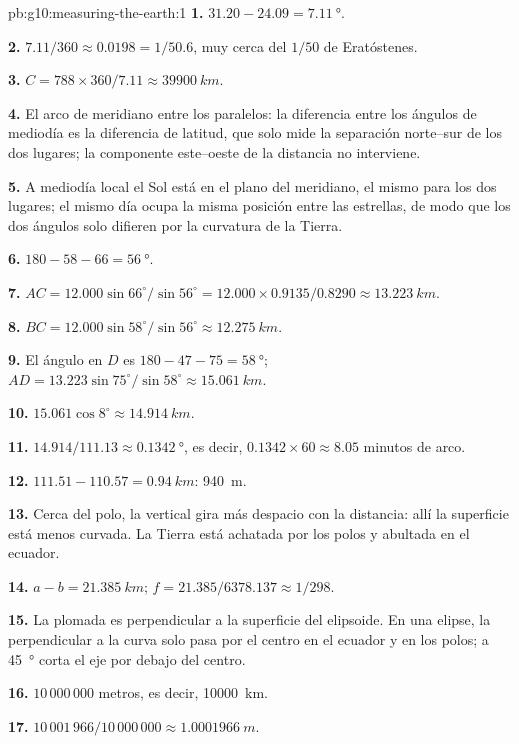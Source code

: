 \begin{solution}{pb:g10:measuring-the-earth:1}
\textbf{1.} $31.20 - 24.09 = \qty{7.11}{\degree}$.

\textbf{2.} $7.11/360 \approx 0.0198 = 1/50.6$, muy cerca del $1/50$ de
Eratóstenes.

\textbf{3.} $C = 788 \times 360/7.11 \approx \qty{39900}{km}$.

\textbf{4.} El arco de meridiano entre los paralelos: la diferencia entre
los ángulos de mediodía es la diferencia de latitud, que solo mide la
separación norte--sur de los dos lugares; la componente este--oeste de la
distancia no interviene.

\textbf{5.} A mediodía local el Sol está en el plano del meridiano, el mismo
para los dos lugares; el mismo día ocupa la misma posición entre las
estrellas, de modo que los dos ángulos solo difieren por la curvatura de la
Tierra.

\textbf{6.} $180 - 58 - 66 = \qty{56}{\degree}$.

\textbf{7.} $AC = 12.000 \sin 66^\circ/\sin 56^\circ = 12.000 \times
0.9135/0.8290 \approx \qty{13.223}{km}$.

\textbf{8.} $BC = 12.000 \sin 58^\circ/\sin 56^\circ \approx \qty{12.275}{km}$.

\textbf{9.} El ángulo en $D$ es $180 - 47 - 75 = \qty{58}{\degree}$;
$AD = 13.223 \sin 75^\circ/\sin 58^\circ \approx \qty{15.061}{km}$.

\textbf{10.} $15.061 \cos 8^\circ \approx \qty{14.914}{km}$.

\textbf{11.} $14.914/111.13 \approx \qty{0.1342}{\degree}$, es decir,
$0.1342 \times 60 \approx 8.05$ minutos de arco.

\textbf{12.} $111.51 - 110.57 = \qty{0.94}{km}$: \qty{940}{m}.

\textbf{13.} Cerca del polo, la vertical gira más despacio con la distancia:
allí la superficie está menos curvada. La Tierra está achatada por los polos
y abultada en el ecuador.

\textbf{14.} $a - b = \qty{21.385}{km}$; $f = 21.385/6378.137 \approx 1/298$.

\textbf{15.} La plomada es perpendicular a la superficie del elipsoide. En
una elipse, la perpendicular a la curva solo pasa por el centro en el ecuador
y en los polos; a \qty{45}{\degree} corta el eje por debajo del centro.

\textbf{16.} $10\,000\,000$ metros, es decir, \qty{10000}{km}.

\textbf{17.} $10\,001\,966/10\,000\,000 \approx \qty{1.0001966}{m}$.


\end{solution}
